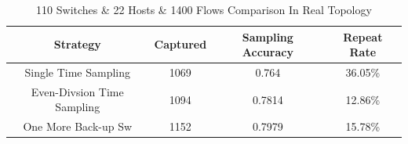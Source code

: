 \documentclass[conference,compsoc]{IEEEtran}
\begin{document}
\begin{table}[]
\centering
\caption{110 Switches \& 22 Hosts \&  1400 Flows Comparison In Real Topology }
\begin{tabular}{|c|c|c|c|} 


\hline 
Strategy & Captured  &Sampling Accuracy& Repeat Rate\\
\hline 
Single Time Sampling &  1069 &0.764 & 36.05\%\\
\hline  

Even-Divsion Time Sampling&1094 & 0.7814 & 12.86\%\\
\hline
One More Back-up Sw & 1152 & 0.7979 & 15.78\%\\

\hline 
\end{tabular}
\end{table}
\end{document}
